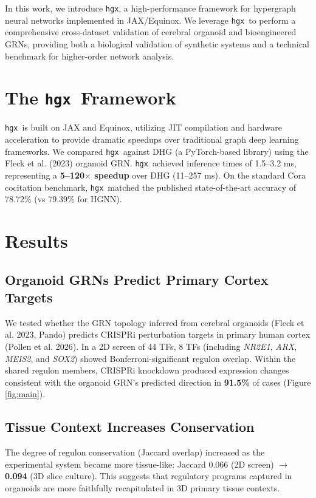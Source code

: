 \documentclass[11pt,twocolumn]{article}
\newcommand{\hgx}{\texttt{hgx}}
\begin{document}
In this work, we introduce \hgx, a high-performance framework for hypergraph neural networks implemented in JAX/Equinox. We leverage \hgx\ to perform a comprehensive cross-dataset validation of cerebral organoid and bioengineered GRNs, providing both a biological validation of synthetic systems and a technical benchmark for higher-order network analysis.

\section{The \hgx\ Framework}

\hgx\ is built on JAX and Equinox, utilizing JIT compilation and hardware acceleration to provide dramatic speedups over traditional graph deep learning frameworks. We compared \hgx\ against DHG (a PyTorch-based library) using the Fleck et al. (2023) organoid GRN. \hgx\ achieved inference times of 1.5--3.2 ms, representing a \textbf{5--120$\times$ speedup} over DHG (11--257 ms). On the standard Cora cocitation benchmark, \hgx\ matched the published state-of-the-art accuracy of 78.72\% (vs 79.39\% for HGNN).

\section{Results}

\subsection{Organoid GRNs Predict Primary Cortex Targets}

We tested whether the GRN topology inferred from cerebral organoids (Fleck et al. 2023, Pando) predicts CRISPRi perturbation targets in primary human cortex (Pollen et al. 2026). In a 2D screen of 44 TFs, 8 TFs (including \textit{NR2E1}, \textit{ARX}, \textit{MEIS2}, and \textit{SOX2}) showed Bonferroni-significant regulon overlap. Within the shared regulon members, CRISPRi knockdown produced expression changes consistent with the organoid GRN's predicted direction in \textbf{91.5\%} of cases (Figure \ref{fig:main}).

\subsection{Tissue Context Increases Conservation}

The degree of regulon conservation (Jaccard overlap) increased as the experimental system became more tissue-like: Jaccard 0.066 (2D screen) $\rightarrow$ \textbf{0.094} (3D slice culture). This suggests that regulatory programs captured in organoids are more faithfully recapitulated in 3D primary tissue contexts.
\end{document}
